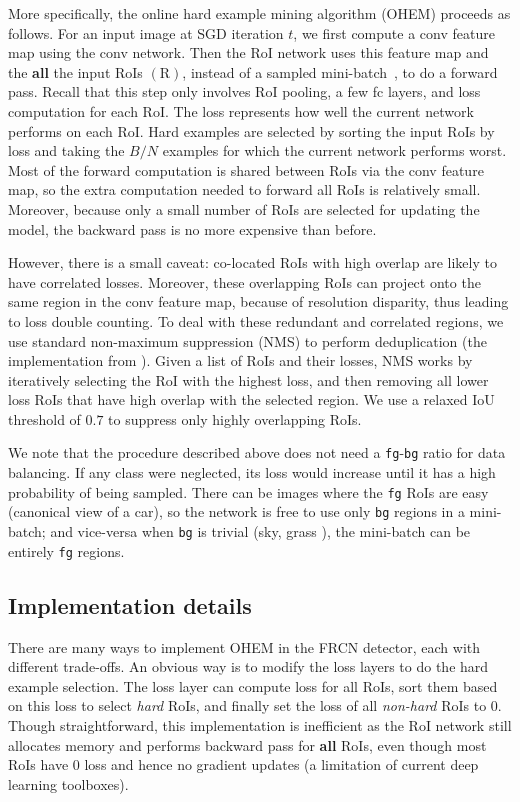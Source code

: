 \documentclass[10pt,twocolumn,letterpaper]{article}
\begin{document}
More specifically, the online hard example mining algorithm (OHEM) proceeds as follows. For an input image at SGD iteration $t$, we first compute a conv feature map using the conv network. Then the RoI network uses this feature map and the \textbf{all} the input RoIs $(\mathrm{R})$, instead of a sampled mini-batch~\cite{frcn}, to do a forward pass. Recall that this step only involves RoI pooling, a few fc layers, and loss computation for each RoI. The loss represents how well the current network performs on each RoI. Hard examples are selected by sorting the input RoIs by loss and taking the $B/N$ examples for which the current network performs worst. Most of the forward computation is shared between RoIs via the conv feature map, so the extra computation needed to forward all RoIs is relatively small. Moreover, because only a small number of RoIs are selected for updating the model, the backward pass is no more expensive than before.

However, there is a small caveat: co-located RoIs with high overlap are likely to have correlated losses. Moreover, these overlapping RoIs can project onto the same region in the conv feature map, because of resolution disparity, thus leading to loss double counting. To deal with these redundant and correlated regions, we use standard non-maximum suppression (NMS) to perform deduplication (the implementation from \cite{frcn}). Given a list of RoIs and their losses, NMS works by iteratively selecting the RoI with the highest loss, and then removing all lower loss RoIs that have high overlap with the selected region. We use a relaxed IoU threshold of $0.7$ to suppress only highly overlapping RoIs.

We note that the procedure described above does not need a \texttt{fg}-\texttt{bg} ratio for data balancing. If any class were neglected, its loss would increase until it has a high probability of being sampled. There can be images where the \texttt{fg} RoIs are easy (\eg canonical view of a car), so the network is free to use only \texttt{bg} regions in a mini-batch; and vice-versa when \texttt{bg} is trivial (\eg sky, grass \etc), the mini-batch can be entirely \texttt{fg} regions.



\subsection{Implementation details}\label{sec:details}
There are many ways to implement OHEM in the FRCN detector, each with different trade-offs. An obvious way is to modify the loss layers to do the hard example selection. The loss layer can compute loss for all RoIs, sort them based on this loss to select \emph{hard} RoIs, and finally set the loss of all \emph{non-hard} RoIs to $0$. Though straightforward, this implementation is inefficient as the RoI network still allocates memory and performs backward pass for \textbf{all} RoIs, even though most RoIs have $0$ loss and hence no gradient updates (a limitation of current deep learning toolboxes).
\end{document}
